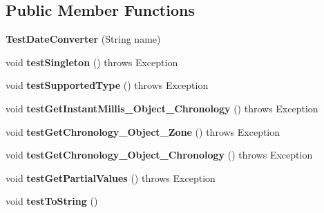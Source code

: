 \subsection*{Public Member Functions}
\begin{DoxyCompactItemize}
\item 
\hypertarget{classorg_1_1joda_1_1time_1_1convert_1_1_test_date_converter_a61612f6ff8b1b6c3a216a2ae68d10ba5}{{\bfseries Test\-Date\-Converter} (String name)}\label{classorg_1_1joda_1_1time_1_1convert_1_1_test_date_converter_a61612f6ff8b1b6c3a216a2ae68d10ba5}

\item 
\hypertarget{classorg_1_1joda_1_1time_1_1convert_1_1_test_date_converter_a7b07b4b5fc05b675e7b39fd1184f1ceb}{void {\bfseries test\-Singleton} ()  throws Exception }\label{classorg_1_1joda_1_1time_1_1convert_1_1_test_date_converter_a7b07b4b5fc05b675e7b39fd1184f1ceb}

\item 
\hypertarget{classorg_1_1joda_1_1time_1_1convert_1_1_test_date_converter_a02280b6fd42bd1040cdd388905cb74b8}{void {\bfseries test\-Supported\-Type} ()  throws Exception }\label{classorg_1_1joda_1_1time_1_1convert_1_1_test_date_converter_a02280b6fd42bd1040cdd388905cb74b8}

\item 
\hypertarget{classorg_1_1joda_1_1time_1_1convert_1_1_test_date_converter_a8748166cdc3546adf97f73ad5f28b916}{void {\bfseries test\-Get\-Instant\-Millis\-\_\-\-Object\-\_\-\-Chronology} ()  throws Exception }\label{classorg_1_1joda_1_1time_1_1convert_1_1_test_date_converter_a8748166cdc3546adf97f73ad5f28b916}

\item 
\hypertarget{classorg_1_1joda_1_1time_1_1convert_1_1_test_date_converter_a23eef6e95f7d1e5c85f476f7df74cac7}{void {\bfseries test\-Get\-Chronology\-\_\-\-Object\-\_\-\-Zone} ()  throws Exception }\label{classorg_1_1joda_1_1time_1_1convert_1_1_test_date_converter_a23eef6e95f7d1e5c85f476f7df74cac7}

\item 
\hypertarget{classorg_1_1joda_1_1time_1_1convert_1_1_test_date_converter_aec3c95f9ed8b650f7d7df9d33be8790a}{void {\bfseries test\-Get\-Chronology\-\_\-\-Object\-\_\-\-Chronology} ()  throws Exception }\label{classorg_1_1joda_1_1time_1_1convert_1_1_test_date_converter_aec3c95f9ed8b650f7d7df9d33be8790a}

\item 
\hypertarget{classorg_1_1joda_1_1time_1_1convert_1_1_test_date_converter_a21a00b5b0545f8927fca2d94af23bc56}{void {\bfseries test\-Get\-Partial\-Values} ()  throws Exception }\label{classorg_1_1joda_1_1time_1_1convert_1_1_test_date_converter_a21a00b5b0545f8927fca2d94af23bc56}

\item 
\hypertarget{classorg_1_1joda_1_1time_1_1convert_1_1_test_date_converter_a81d99c0b503d9237b61b4ea4dce82a1c}{void {\bfseries test\-To\-String} ()}\label{classorg_1_1joda_1_1time_1_1convert_1_1_test_date_converter_a81d99c0b503d9237b61b4ea4dce82a1c}

\end{DoxyCompactItemize}
